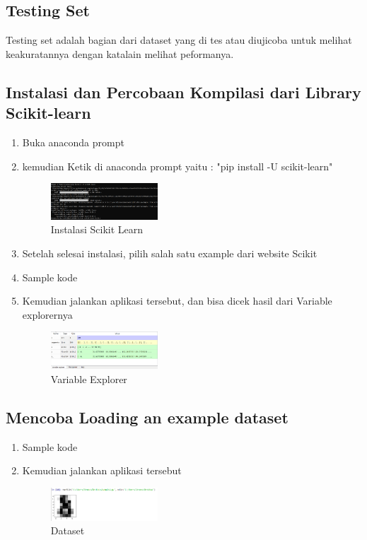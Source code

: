 	\subsection{Testing Set}
	Testing set adalah bagian dari dataset yang di tes atau diujicoba untuk melihat keakuratannya dengan katalain melihat peformanya.
	
	\subsection{Instalasi dan Percobaan Kompilasi dari Library Scikit-learn}
	\begin{enumerate}
		\item Buka anaconda prompt
		\item kemudian Ketik di anaconda prompt yaitu : "pip install -U scikit-learn" \break
		\begin{figure}[H]
			\includegraphics[width=4cm]{figures/1174043/chapter1/1.png}
			\centering
			\caption{Instalasi Scikit Learn}
		\end{figure}
		\item Setelah selesai instalasi, pilih salah satu example dari website Scikit
		\item Sample kode \break 
		\item Kemudian jalankan aplikasi tersebut, dan bisa dicek hasil dari Variable explorernya \break
		\begin{figure}[H]
			\includegraphics[width=4cm]{figures/1174043/chapter1/hasil_sample.png}
			\centering
			\caption{Variable Explorer}
		\end{figure}
	\end{enumerate}
	
	\subsection{Mencoba Loading an example dataset}
	\begin{enumerate}
		\item Sample kode \break 
		\item Kemudian jalankan aplikasi tersebut \break
		\begin{figure}[H]
			\includegraphics[width=4cm]{figures/1174043/chapter1/hasil_dataset.png}
			\centering
			\caption{Dataset}
		\end{figure}
	\end{enumerate}
	
